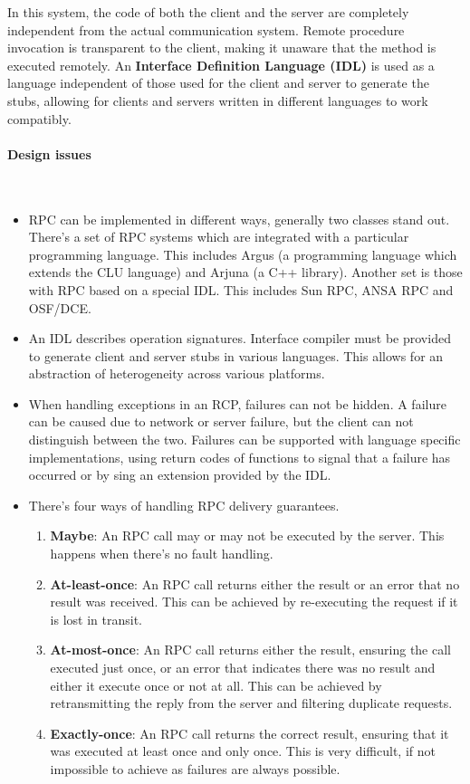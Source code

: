 \documentclass[a4paper]{article}
\newcommand{\subsubsubsection}[1]{\paragraph{#1}\mbox{}\\}
\begin{document}
In this system, the code of both the client and the server are completely independent from the actual communication system. Remote procedure invocation is transparent to the client, making it unaware that the method is executed remotely. An \textbf{Interface Definition Language (IDL)} is used as a language independent of those used for the client and server to generate the stubs, allowing for clients and servers written in different languages to work compatibly.

\subsubsubsection{Design issues}

\begin{itemize}
\item RPC can be implemented in different ways, generally two classes stand out. There's a set of RPC systems which are integrated with a particular programming language. This includes Argus (a programming language which extends the CLU language) and Arjuna (a C++ library). Another set is those with RPC based on a special IDL. This includes Sun RPC, ANSA RPC and OSF/DCE.
\item An IDL describes operation signatures. Interface compiler must be provided to generate client and server stubs in various languages. This allows for an abstraction of heterogeneity across various platforms.
\item When handling exceptions in an RCP, failures can not be hidden. A failure can be caused due to network or server failure, but the client can not distinguish between the two. Failures can be supported with language specific implementations, using return codes of functions to signal that a failure has occurred or by sing an extension provided by the IDL.
\item There's four ways of handling RPC delivery guarantees.
\begin{enumerate}
\item \textbf{Maybe}: An RPC call may or may not be executed by the server. This happens when there's no fault handling.
\item \textbf{At-least-once}: An RPC call returns either the result or an error that no result was received. This can be achieved by re-executing the request if it is lost in transit.
\item \textbf{At-most-once}: An RPC call returns either the result, ensuring the call executed just once, or an error that indicates there was no result and either it execute once or not at all. This can be achieved by retransmitting the reply from the server and filtering duplicate requests.
\item \textbf{Exactly-once}: An RPC call returns the correct result, ensuring that it was executed at least once and only once. This is very difficult, if not impossible to achieve as failures are always possible.

\end{enumerate}
\end{itemize}
\end{document}
